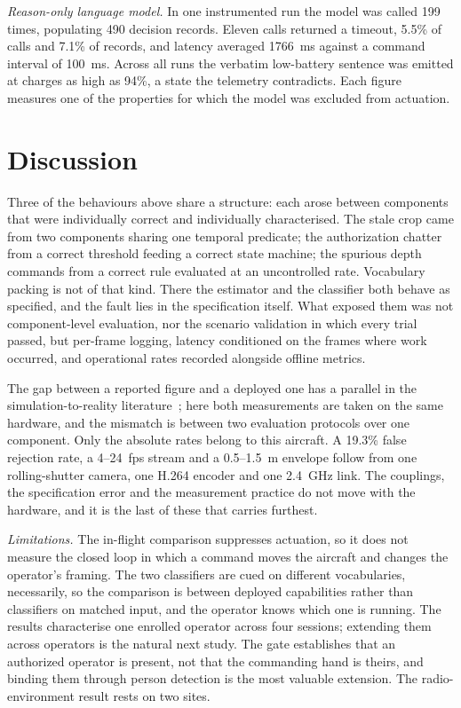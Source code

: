 \documentclass[conference]{IEEEtran}
\begin{document}
\emph{Reason-only language model.}
In one instrumented run the model was called 199 times, populating 490 decision
records.
Eleven calls returned a timeout, 5.5\% of calls and 7.1\% of records, and
latency averaged 1766~ms against a command interval of 100~ms.
Across all runs the verbatim low-battery sentence was emitted at charges as high
as 94\%, a state the telemetry contradicts.
Each figure measures one of the properties for which the model was excluded
from actuation.

\section{Discussion}

Three of the behaviours above share a structure: each arose between components
that were individually correct and individually characterised. The stale crop
came from two components sharing one temporal predicate; the authorization
chatter from a correct threshold feeding a correct state machine; the spurious
depth commands from a correct rule evaluated at an uncontrolled rate.
Vocabulary packing is not of that kind. There the estimator and the classifier
both behave as specified, and the fault lies in the specification itself.
What exposed them was not component-level evaluation, nor the scenario
validation in which every trial passed, but per-frame logging, latency
conditioned on the frames where work occurred, and operational rates recorded
alongside offline metrics.

The gap between a reported figure and a deployed one has a parallel in the
simulation-to-reality literature~\cite{aljalbout2025realitygap}; here both
measurements are taken on the same hardware, and the mismatch is between two
evaluation protocols over one component.
Only the absolute rates belong to this aircraft.
A 19.3\% false rejection rate, a 4--24~fps stream and a 0.5--1.5~m envelope
follow from one rolling-shutter camera, one H.264 encoder and one 2.4~GHz link.
The couplings, the specification error and the measurement practice do not move
with the hardware, and it is the last of these that carries furthest.

\emph{Limitations.}
The in-flight comparison suppresses actuation, so it does not measure the closed
loop in which a command moves the aircraft and changes the operator's framing.
The two classifiers are cued on different vocabularies, necessarily, so the
comparison is between deployed capabilities rather than classifiers on matched
input, and the operator knows which one is running.
The results characterise one enrolled operator across four sessions; extending
them across operators is the natural next study.
The gate establishes that an authorized operator is present, not that the
commanding hand is theirs, and binding them through person detection is the most
valuable extension.
The radio-environment result rests on two sites.
\end{document}
